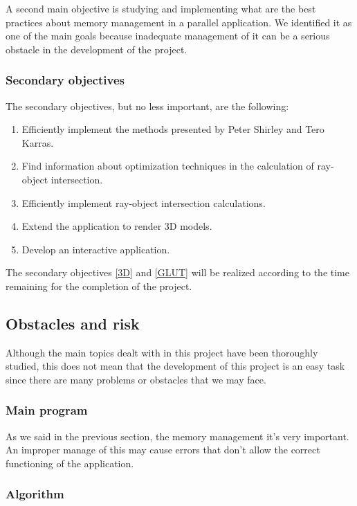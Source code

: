\documentclass[titlepage,12pt]{report}
\begin{document}
A second main objective is studying and implementing what are the best practices about memory management in a parallel application. We identified it as one of the main goals because inadequate management of it can be a serious obstacle in the development of the project.

\subsubsection{Secondary objectives}

The secondary objectives, but no less important, are the following:

\begin{enumerate}
	\item Efficiently implement the methods presented by Peter Shirley and Tero Karras.
	\item Find information about optimization techniques in the calculation of ray-object intersection.
	\item Efficiently implement ray-object intersection calculations.
	\item \label{3D} Extend the application to render 3D models.
	\item \label{GLUT} Develop an interactive application.
\end{enumerate}

The secondary objectives \ref{3D} and \ref{GLUT} will be realized according to the time remaining for the completion of the project.

\subsection{Obstacles and risk}

Although the main topics dealt with in this project have been thoroughly studied, this does not mean that the development of this project is an easy task since there are many problems or obstacles that we may face.

\subsubsection{Main program}

As we said in the previous section, the memory management it's very important. An improper manage of this may cause errors that don't allow the correct functioning of the application.

\subsubsection{Algorithm}
\end{document}
